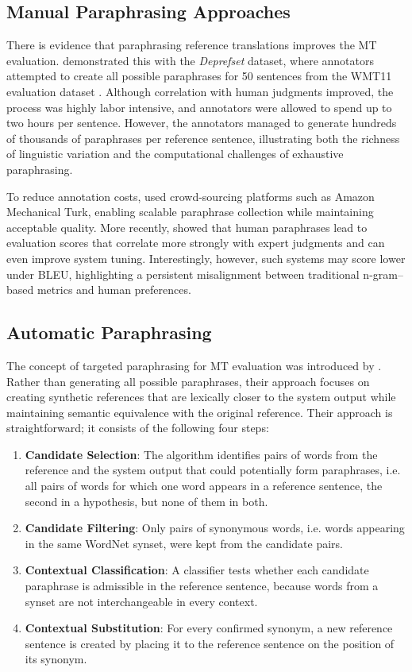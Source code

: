 \subsection{Manual Paraphrasing Approaches}
There is evidence that paraphrasing reference translations improves the MT evaluation. \cite{bojar-scratching} demonstrated this with the \textit{Deprefset} dataset, where annotators attempted to create all possible paraphrases for 50 sentences from the WMT11 evaluation dataset \citep{wmt11}. Although correlation with human judgments improved, the process was highly labor intensive, and annotators were allowed to spend up to two hours per sentence. However, the annotators managed to generate hundreds of thousands of paraphrases per reference sentence, illustrating both the richness of linguistic variation and the computational challenges of exhaustive paraphrasing.

To reduce annotation costs,  \cite{bloodgood-callison-burch-2010-using} used crowd-sourcing platforms such as Amazon Mechanical Turk, enabling scalable paraphrase collection while maintaining acceptable quality. More recently, \cite{freitag-etal-2020-bleu} showed that human paraphrases lead to evaluation scores that correlate more strongly with expert judgments and can even improve system tuning. Interestingly, however, such systems may score lower under BLEU, highlighting a persistent misalignment between traditional n-gram–based metrics and human preferences.

\subsection{Automatic Paraphrasing}
\label{generating_paraphrases}
The concept of targeted paraphrasing for MT evaluation was introduced by \cite{kauchak}. Rather than generating all possible paraphrases, their approach focuses on creating synthetic references that are lexically closer to the system output while maintaining semantic equivalence with the original reference. Their approach is straightforward; it consists of the following four steps:

\begin{enumerate}
    \item \textbf{Candidate Selection}: The algorithm identifies pairs of words from the reference and the system output that could potentially form paraphrases, i.e. all pairs of words for which one word appears in a reference sentence, the second in a hypothesis, but none of them in both.
    \item\textbf{Candidate Filtering}: Only pairs of synonymous words, i.e. words appearing in the same WordNet \cite{wordnet} synset, were kept from the candidate pairs. 
    \item \textbf{Contextual Classification}: A classifier tests whether each candidate paraphrase is admissible in the  reference sentence, because words from a synset are not interchangeable in every context.    
    \item\textbf{Contextual Substitution}: For every confirmed synonym, a new reference sentence is created by placing it to the reference sentence on the position of its synonym. 
\end{enumerate}

